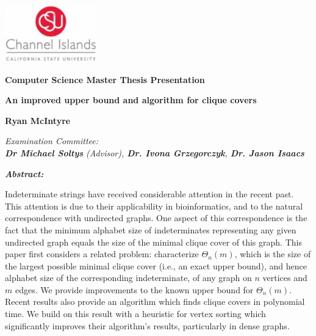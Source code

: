\documentclass{article}
\begin{document}
\begin{center}

\includegraphics[width=0.3\textwidth]{CI_Logo.png}\\

\hfill\break

\LARGE
\textbf{\color{grey}Computer Science Master Thesis Presentation}\\

\hfill\break
\hfill\break

\Large
{\bf An improved upper bound and algorithm for clique covers}\\

\vspace{5mm}

\large
{\bf Ryan McIntyre}\\

\vspace{5mm}

\large
\textit{ Examination Committee:\\
{\bf Dr Michael Soltys} (Advisor), {\bf Dr. Ivona Grzegorczyk}, {\bf
Dr. Jason Isaacs}}\\

\hfill\break

\end{center}

\begin{adjustwidth}{1in}{1in}
\textit{\bf Abstract:}\\

\vspace{3mm}

\normalsize
\noindent Indeterminate strings have received considerable attention
in the recent past. This attention is due to their applicability in
bioinformatics, and to the natural correspondence with undirected
graphs.  One aspect of this correspondence is the fact that the
minimum alphabet size of indeterminates representing any given
undirected graph equals the size of the minimal clique cover of this
graph.  This paper first considers a related problem: characterize
$\Theta_n(m)$, which is the size of the largest possible minimal
clique cover (i.e., an exact upper bound), and hence alphabet size of
the corresponding indeterminate, of any graph on $n$ vertices and $m$
edges. We provide improvements to the known upper bound for
$\Theta_n(m)$.  Recent results also provide an algorithm
which finds clique covers in polynomial time. We build on this result
with a heuristic for vertex sorting which significantly improves their
algorithm's results, particularly in dense graphs.
\end{adjustwidth}
\end{document}
